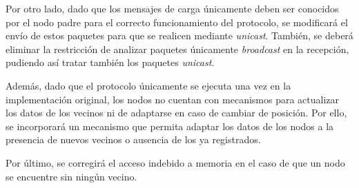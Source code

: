 Por otro lado, dado que los mensajes de carga únicamente deben ser conocidos por el nodo padre para el correcto funcionamiento del protocolo, se modificará el envío de estos paquetes para que se realicen mediante \textit{unicast}.
También, se deberá eliminar la restricción de analizar paquetes únicamente \textit{broadcast} en la recepción, pudiendo así tratar también los paquetes \textit{unicast}. 

Además, dado que el protocolo únicamente se ejecuta una vez en la implementación original, los nodos no cuentan con mecanismos para actualizar los datos de los vecinos ni de adaptarse en caso de cambiar de posición.
Por ello, se incorporará un mecanismo que permita adaptar los datos de los nodos a la presencia de nuevos vecinos o ausencia de los ya registrados.

Por último, se corregirá el acceso indebido a memoria en el caso de que un nodo se encuentre sin ningún vecino.
